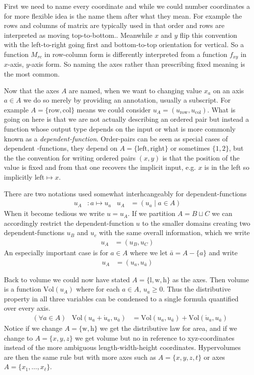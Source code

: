 First we need to name every coordinate and while we could number coordinates 
a for more flexible idea is the name them after what they mean.  For example 
the rows and columns of matrix are typically used in that order and rows 
are interpreted as moving top-to-bottom..  Meanwhile $x$ and $y$ flip this 
convention with the left-to-right going first and bottom-to-top orientation for 
vertical.  So a function $M_{rc}$ in row-column form is differently interpreted 
from a function $f_{xy}$ in $x$-axis, $y$-axis form.  So naming the axes 
rather than prescribing fixed meaning is the most common.

Now that the axes $A$ are named, when we want to changing value $x_a$ on an axis $a\in A$ 
we do so merely by providing an annotation, usually a subscript.
For example $A=\{\text{row},\text{col}\}$ means we could consider 
$u_A=(u_{\text{row}}, u_{\text{col}})$.  What is going on here is that we are not actually
describing an ordered pair but instead a function whose output type depends on the input
or what is more commonly known as a \emph{dependent-function}.  Order-pairs 
can be seen as special cases of dependent -functions, they depend on $A=\{\text{left},\text{right}\}$
or sometimes $\{1,2\}$, but the the convention for writing ordered pairs $(x,y)$ is that the 
position of the value is fixed and from that one recovers the implicit input, e.g. $x$ is in the left 
so implicitly $\text{left}\mapsto x$.

There are two notations used somewhat interhcangeably for dependent-functions
\begin{align}
    u_A & :a\mapsto u_a & 
    u_A & = (u_a\mid a\in A)
\end{align}
When it become tedious we write $u=u_A$.
If we partition $A=B\sqcup C$ we can accordingly restrict the dependent-function $u$ 
to the smaller domains creating two dependent-functions $u_B$ and $u_c$ with the same overall information,
which we write
\begin{align*}
    u_A & = (u_B, u_C)
\end{align*}
An especially important case is for $a\in A$ where we let $\bar{a}=A-\{a\}$ and write 
\begin{align*}
    u_A & = (u_a,u_{\bar{a}})
\end{align*}

Back to volume we could now have stated $A=\{\text{l},\text{w},\text{h}\}$ as the axes.
Then volume is a function $\text{Vol}(u_A)$ where for each $a\in A$, $u_a\geq 0$.  Thus 
the distributive property in all three variables can be condensed to a single formula 
quantified over every axis.
\begin{align*}
    & (\forall a\in A)
    &
    \text{Vol}(u_{a}+\acute{u}_a,u_{\bar{a}}) & = \text{Vol}(u_a,u_{\bar{a}}) + \text{Vol}(\acute{u}_a,u_{\bar{a}}) 
\end{align*}
Notice if we change $A=\{\text{w},\text{h}\}$ we get the distributive law for area, 
and if we change to $A=\{x,y,z\}$ we get volume but no in reference to xyz-coordinates
instead of the more ambiguous length-width-height coordinates.  Hypervolumes are 
then the same rule but with more axes such as $A=\{x,y,z,t\}$ or axes $A=\{x_1,\ldots, x_{\ell}\}$.

